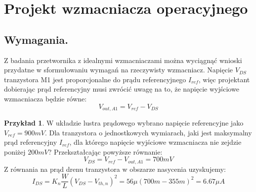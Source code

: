 \documentclass[10pt,a4paper]{report}
\theoremstyle{definition}
\theoremstyle{definition}
\theoremstyle{definition}
\newtheorem{przyklad}{Przykład}[section]
\theoremstyle{definition}
\theoremstyle{definition}
\begin{document}
	\section{Projekt wzmacniacza operacyjnego}
	
	\subsection{Wymagania.}
	{	Z badania przetwornika z idealnymi wzmacniaczami można wyciągnąć wnioski przydatne w sformułowaniu wymagań na rzeczywisty wzmacniacz. Napięcie $V_{DS}$ tranzystora M1 jest proporcjonalne do prądu referencyjnego $I_{ref}$, więc projektant dobierając prąd referencyjny musi zwrócić uwagę na to, że napięcie wyjściowe wzmacniacza będzie równe:
		\begin{equation}
			V_{out,A1} = V_{ref} - V_{DS}
		\end{equation} 
	\begin{przyklad}{W układzie lustra prądowego wybrano napięcie referencyjne jako $V_{ref} = 900mV$. Dla tranzystora o jednostkowych wymiarach, jaki jest maksymalny prąd referencyjny $I_{ref}$, dla którego napięcie wyjściowe wzmacniacza nie zejdzie poniżej $200mV$?}
		{Przekształcając powyższe równanie:
			\begin{equation}
				V_{DS} = V_{ref} - V_{out,A1} = 700mV
			\end{equation}
		Z równania na prąd drenu tranzystora w obszarze nasycenia uzyskujemy:
			\begin{equation}
				I_{DS} = K_n \frac{W}{L} \left(V_{DS} - V_{th,n}\right)^2 = 56 \mu \left(700m - 355m\right)^2 = 6.67 \mu A
			\end{equation}	
}
	\end{przyklad}
}
\end{document}

